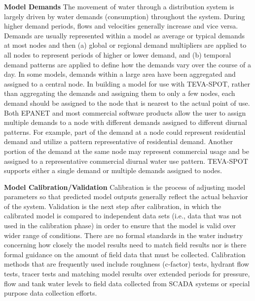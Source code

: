 {\bf Model Demands}
The movement of water through a distribution system is largely driven by water demands (consumption) throughout the system. During higher demand periods, flows and velocities generally increase and vice versa. Demands are usually represented within a model as average or typical demands at most nodes and then (a) global or regional demand multipliers are applied to all nodes to represent periods of higher or lower demand, and (b) temporal demand patterns are applied to define how the demands vary over the course of a day.  In some models, demands within a large area have been aggregated and assigned to a central node.  In building a model for use with TEVA-SPOT, rather than aggregating the demands and assigning them to only a few nodes, each demand should be assigned to the node that is nearest to the actual point of use. Both EPANET and most commercial software products allow the user to assign multiple demands to a node with different demands assigned to different diurnal patterns. For example, part of the demand at a node could represent residential demand and utilize a pattern representative of residential demand. Another portion of the demand at the same node may represent commercial usage and be assigned to a representative commercial diurnal water use pattern. TEVA-SPOT supports either a single demand or multiple demands assigned to nodes. 

{\bf Model Calibration/Validation}
Calibration is the process of adjusting model parameters so that predicted model outputs generally reflect the actual behavior of the system. Validation is the next step after calibration, in which the calibrated model is compared to independent data sets (i.e., data that was not used in the calibration phase) in order to ensure that the model is valid over wider range of conditions. There are no formal standards in the water industry concerning how closely the model results need to match field results nor is there formal guidance on the amount of field data that must be collected. Calibration methods that are frequently used include roughness (c-factor) tests, hydrant flow tests, tracer tests and matching model results over extended periods for pressure, flow and tank water levels to field data collected from SCADA systems or special purpose data collection efforts. 

